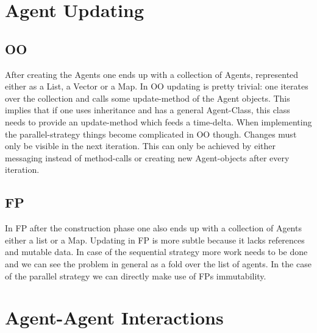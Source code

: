 \section{Agent Updating}
\subsection{OO}
After creating the Agents one ends up with a collection of Agents, represented either as a List, a Vector or a Map. In OO updating is pretty trivial: one iterates over the collection and calls some update-method of the Agent objects. This implies that if one uses inheritance and has a general Agent-Class, this class needs to provide an update-method which feeds a time-delta.
When implementing the parallel-strategy things become complicated in OO though. Changes must only be visible in the next iteration. This can only be achieved by either messaging instead of method-calls or creating new Agent-objects after every iteration.

\subsection{FP}
In FP after the construction phase one also ends up with a collection of Agents either a list or a Map. Updating in FP is more subtle because it lacks references and mutable data. In case of the sequential strategy more work needs to be done and we can see the problem in general as a fold over the list of agents. In the case of the parallel strategy we can directly make use of FPs immutability.

\section{Agent-Agent Interactions}
